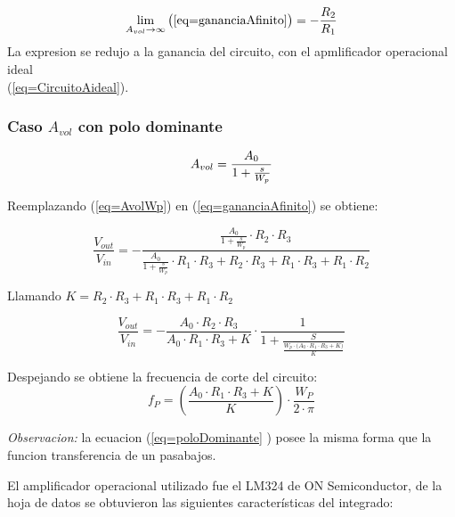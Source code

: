 \documentclass[../../main.tex]{subfiles}
\begin{document}
$$ \lim_{A_{vol}\to\infty} \big( \ref{eq=gananciaAfinito} \big) = -\frac{R_{2}}{R_{1}} $$
La expresion se redujo a la ganancia del circuito, con el apmlificador operacional ideal\\ \big(\ref{eq=CircuitoAideal}\big).

\subsubsection{Caso $A_{vol}$  con polo dominante}

\begin{equation}
A_{vol }=\frac{A_{0}}{1+\frac{s}{W_{p}}}\label{eq=AvolWp}\\
\end{equation} 

Reemplazando \big(\ref{eq=AvolWp}\big) en  \big(\ref{eq=gananciaAfinito}\big)  se obtiene:

\begin{equation}
\frac{V_{out}}{V_{in}}= - \frac{\frac{A_{0}}{1+\frac{s}{W_{p}}} \cdot R_{2} \cdot R_{3}}{\frac{A_{0}}{1+\frac{s}{W_{p}}}\cdot R_{1} \cdot R_{3} + R_{2} \cdot R_{3} +  R_{1} \cdot R_{3} + R_{1} \cdot R_{2} }
\end{equation}

Llamando $K= R_{2} \cdot R_{3} +  R_{1} \cdot R_{3} + R_{1} \cdot R_{2}$


\begin{equation}
\frac{V_{out}}{V_{in}}=- \frac{A_{0} \cdot  R_{2} \cdot  R_{3} }{A_{0} \cdot R_{1} \cdot  R_{3} + K }  \cdot \frac{1}{1 +\frac {S}{\frac{W_{p}  \cdot \big( A_{0} \cdot R_{1} \cdot R_{3} + K \big) }{K}}} \label{eq=poloDominante}
\end{equation}

 Despejando se obtiene la frecuencia de corte del circuito:
\begin{equation}
f_{P}=\left( \frac {A_{0} \cdot R_{1} \cdot R_{3} + K}{K}\right)  \cdot \frac{W_{P}}{2\cdot \pi}  \label{eq=fCorte}
\end{equation}

\textit{Observacion:}  la ecuacion \big(\ref{eq=poloDominante} \big) posee la misma forma que la funcion transferencia de un pasabajos.



El amplificador operacional utilizado fue el LM324 de ON Semiconductor, de la hoja de datos se obtuvieron las siguientes características del integrado:
\end{document}
